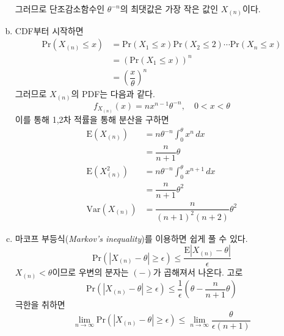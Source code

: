 \documentclass[answers]{exam}
\begin{document}
\begin{questions}
\begin{solution}
\begin{enumerate}[(a)]
\begin{equation}
        \end{equation}
        그러므로 단조감소함수인 $\theta^{-n}$의 최댓값은 가장 작은 값인 $X_{\left(n\right)}$이다.
        \item CDF부터 시작하면
        \begin{align}
          \mathrm{Pr}\left(X_{\left(n\right)}\leq x\right) &= \mathrm{Pr}\left(X_{1}\leq x\right)\mathrm{Pr}\left(X_{2}\leq 2\right)\cdots\mathrm{Pr}\left(X_{n}\leq x\right)\\
          &= \left(\mathrm{Pr}\left(X_{1}\leq x\right)\right)^{n}\\
          &= \left(\dfrac{x}{\theta}\right)^{n}
        \end{align}
        그러므로 $X_{\left(n\right)}$의 PDF는 다음과 같다.
        \begin{equation}
          f_{X_{\left(n\right)}}\left(x\right) = nx^{n-1}\theta^{-n}, \quad 0<x<\theta
        \end{equation}
        이를 통해 1,2차 적률을 통해 분산을 구하면
        \begin{align}
          \mathrm{E}\left(X_{\left(n\right)}\right) &= n\theta^{-n}\int_{0}^{\theta}x^{n}\,dx\\
          &= \dfrac{n}{n+1}\theta\\
          \mathrm{E}\left(X_{\left(n\right)}^{2}\right) &= n\theta^{-n}\int_{0}^{\theta}x^{n+1}\,dx\\
          &= \dfrac{n}{n+1}\theta^{2}\\
          \mathrm{Var}\left(X_{\left(n\right)}\right) &= \dfrac{n}{\left(n+1\right)^{2}\left(n+2\right)}\theta^{2}
        \end{align}
        \item 마코프 부등식(\emph{Markov's inequality})를 이용하면 쉽게 풀 수 있다.
        \begin{equation}
          \mathrm{Pr}\left(\left|X_{\left(n\right)}-\theta\right|\geq \epsilon \right)\leq \dfrac{\mathrm{E}\left|X_{\left(n\right)}-\theta\right|}{\epsilon}
        \end{equation}
        $X_{\left(n\right)}<\theta$이므로 우변의 분자는 $(-)$가 곱해져서 나온다. 고로 
        \begin{equation}
          \mathrm{Pr}\left(\left|X_{\left(n\right)}-\theta\right|\geq \epsilon \right)\leq \dfrac{1}{\epsilon}\left(\theta-\dfrac{n}{n+1}\theta\right)
        \end{equation}
        극한을 취하면
        \begin{equation}
          \lim_{n\to\infty}\mathrm{Pr}\left(\left|X_{\left(n\right)}-\theta\right|\geq \epsilon \right)\leq \lim_{n\to\infty}\dfrac{\theta}{\epsilon\left(n+1\right)}

\end{equation}
\end{enumerate}
\end{solution}
\end{questions}
\end{document}
